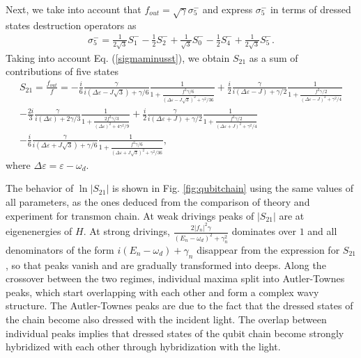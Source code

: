 \documentclass[%
 aps, pra,
 amsmath,amssymb,
 preprint,%
superscriptaddress
]{revtex4-2}
\begin{document}
Next, we take
into account that $f_{out}=\sqrt{\gamma} \sigma_{5}^{-}$ and express $\sigma_{5}^{-} $ in terms of dressed states destruction operators as \begin{eqnarray}
\sigma_5^{-}=\frac{1}{2\sqrt{3}}S_1^{-} - \frac{1}{2}S_2^{-} + \frac{1}{\sqrt{3}}S_0^{-} - \frac{1}{2}S_4^{-} + \frac{1}{2\sqrt{3}}S_5^{-}.
\label{sigma5}
\end{eqnarray}
Taking into account Eq. (\ref{sigmaminusst}), we obtain $S_{21}$ as a sum of contributions of five states
\begin{eqnarray}
S_{21} = \frac{f_{out}}{f}  = - \frac{i}{6} \frac{\gamma}{i\left(\Delta
	\varepsilon - J \sqrt{3}\right) + \gamma/6}
\frac{1}{1+ \frac{ f^2 \gamma /6}{\left(\Delta
		\varepsilon - J \sqrt{3}\right)^2 + \gamma^2/36}}  \nonumber
+\frac{i}{2} \frac{\gamma}{i\left(\Delta
	\varepsilon - J \right) + \gamma/2}
\frac{1}{1+ \frac{ f^2 \gamma /2}{\left(\Delta
		\varepsilon - J \right)^2 + \gamma^2/4}} \\ \nonumber
- \frac{2i}{3} \frac{\gamma}{i\left(\Delta
	\varepsilon \right) + 2\gamma/3}
\frac{1}{1+ \frac{ 2 f^2 \gamma /3}{\left(\Delta
		\varepsilon \right)^2 + 4 \gamma^2/9}} %
+\frac{i}{2} \frac{\gamma}{i\left(\Delta
	\varepsilon + J \right) + \gamma/2}
\frac{1}{1+ \frac{ f^2 \gamma /2}{\left(\Delta
		\varepsilon + J \right)^2 + \gamma^2/4}} \\ %
- \frac{i}{6} \frac{\gamma}{i\left(\Delta
	\varepsilon + J \sqrt{3}\right) + \gamma/6}
\frac{1}{1+ \frac{ f^2 \gamma /6}{\left(\Delta
		\varepsilon + J \sqrt{3}\right)^2 + \gamma^2/36}}, 
\label{bout}
\end{eqnarray}
where $\Delta \varepsilon = \varepsilon - \omega_d$.

The behavior of $\ln |S_{21}|$ is shown in Fig. \ref{fig:qubitchain} using the same values of all parameters, as the ones deduced from the comparison of theory and experiment for transmon chain. At weak drivings peaks of $|S_{21}|$ are at eigenenergies of $H$. At strong drivings,
$ \frac{2 |f_{n}|^2 \gamma}{\left(E_n - \omega_d\right)^2 +
	\gamma_n^2}$ dominates over $1$ and
all denominators of the form $i\left(E_n - \omega_d\right) + \gamma_n$ 
disappear from the expression for $S_{21}$, so that
peaks vanish and are gradually transformed into deeps. Along the crossover between the two regimes,
individual maxima split into Autler-Townes peaks, which start overlapping with each other and form a complex wavy structure. The Autler-Townes peaks are due to the fact that the dressed states of the chain become also dressed with the incident light. The overlap between individual peaks implies that dressed states of the qubit chain become strongly hybridized with each other through hybridization with the light.
\end{document}
